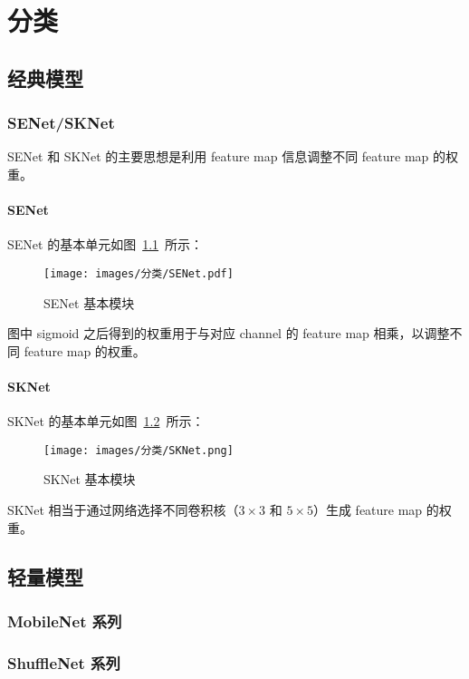 \part{分类}

\chapter{经典模型}

\section{SENet/SKNet}
SENet 和 SKNet 的主要思想是利用 feature map 信息调整不同 feature map 的权重。

\subsection{SENet}
SENet 的基本单元如图~\ref{fig:senet}~所示：

\begin{figure}[ht]
  \centering
  \texttt{[image: images/分类/SENet.pdf]}
  \caption{SENet 基本模块}
  \label{fig:senet}
\end{figure}

图中 sigmoid 之后得到的权重用于与对应 channel 的 feature map 相乘，以调整不
同 feature map 的权重。

\subsection{SKNet}
SKNet 的基本单元如图~\ref{fig:sknet}~所示：

\begin{figure}[ht]
  \centering
  \texttt{[image: images/分类/SKNet.png]}
  \caption{SKNet 基本模块}
  \label{fig:sknet}
\end{figure}

SKNet 相当于通过网络选择不同卷积核（$3 \times 3$ 和 $5 \times 5$）生成 feature
map 的权重。

\chapter{轻量模型}

\section{MobileNet 系列}

\section{ShuffleNet 系列}
